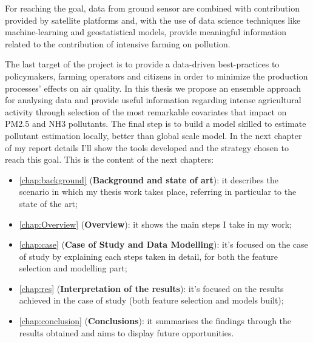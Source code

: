 For reaching the goal, data from ground sensor are combined with contribution provided by satellite platforms and, with the use of data science techniques like machine-learning and geostatistical models, provide meaningful information related to the contribution of intensive farming on pollution.\par
The last target of the project is to provide a data-driven best-practices to policymakers, farming operators and citizens in order to minimize the production processes' effects on air quality.
\bigskip
In this thesis we propose an ensemble approach for analysing data and provide useful information regarding intense agricultural activity through selection of the most remarkable covariates that impact on PM2.5 and NH3 pollutants. 
The final step is to build a model skilled to estimate pollutant estimation locally, better than global scale model.  
In the next chapter of my report details I'll show the tools developed and the strategy chosen to reach this goal. 
This is the content of the next chapters:

\begin{itemize}
  \item \autoref{chap:background} (\textbf{Background and state of art}): it describes the scenario in which my thesis work takes place, referring in particular to the state of the art;
  \item \autoref{chap:Overview} (\textbf{Overview}): it shows the main steps I take in my work;
  \item \autoref{chap:case} (\textbf{Case of Study and Data Modelling}): it's focused on the case of study by explaining each steps taken in detail, for both the feature selection and modelling part;
 \item \autoref{chap:res} (\textbf{Interpretation of the results}): it's focused on the results achieved in the case of study (both feature selection and models built);
 \item \autoref{chap:conclusion} (\textbf{Conclusions}): it summarises the findings through the results obtained and aims to display future opportunities.  
\end{itemize}

